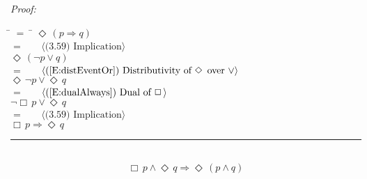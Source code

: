 \documentclass[fleqn, leqno]{article}
\newcommand{\lgap}{2pt}                             %
\newcommand{\mymathindent}{24pt}                    %
\newcommand{\Event}{\Diamond\,}
\newcommand{\Always}{\Box\,}
\newcommand{\myqed}{\hfill\rule[-.23ex]{1.2ex}{2.0ex}}
\newcommand{\Gll} {\langle}                         %
\newcommand{\Ggg} {\rangle}                         %
\newcommand{\Hint}[1]     {\ \ \ $\Gll              \mbox{#1} \Ggg$ }   %
\begin{document}
\emph{Proof:}
\begin{tabbing}
\hspace{\mymathindent} \= $= \;$ \= \kill
  \> \>   $\Event(p \Rightarrow q)$\\[\lgap]
  \> $=$  \>  \Hint{(3.59) Implication}\\[\lgap]
  \> \>   $\Event(\lnot p \lor q)$\\[\lgap]
  \> $=$  \>  \Hint{(\ref{E:distEventOr}) Distributivity of $\Event$ over $\lor$}\\[\lgap]
  \> \>   $\Event\lnot p \lor \Event q$\\[\lgap]
  \> $=$  \>  \Hint{(\ref{E:dualAlways}) Dual of $\Always$}\\[\lgap]
  \> \>   $\lnot\Always p \lor \Event q$\\[\lgap]
  \> $=$  \>  \Hint{(3.59) Implication}\\[\lgap]
  \> \>   $\Always p \Rightarrow \Event q$\\[\lgap]  
\end{tabbing}
\myqed\\[\lgap]


\begin{equation}\label{E:alwaysAndEvent}
\Always p \land \Event q \Rightarrow \Event (p \land q)
\end{equation}
\end{document}
